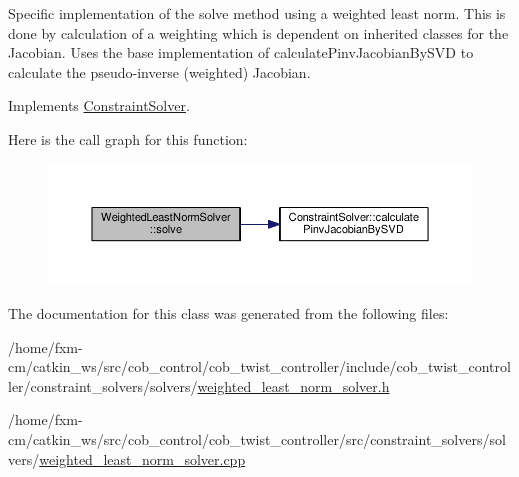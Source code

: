 Specific implementation of the solve method using a weighted least norm. This is done by calculation of a weighting which is dependent on inherited classes for the Jacobian. Uses the base implementation of calculate\-Pinv\-Jacobian\-By\-S\-V\-D to calculate the pseudo-\/inverse (weighted) Jacobian. 

Implements \hyperlink{classConstraintSolver_a6208240cb2dc47fdd9adfc3a069408cd}{Constraint\-Solver}.



Here is the call graph for this function\-:
\nopagebreak
\begin{figure}[H]
\begin{center}
\leavevmode
\includegraphics[width=350pt]{classWeightedLeastNormSolver_a0868fb81e9e75999037d96b4a6407ce7_cgraph}
\end{center}
\end{figure}




The documentation for this class was generated from the following files\-:\begin{DoxyCompactItemize}
\item 
/home/fxm-\/cm/catkin\-\_\-ws/src/cob\-\_\-control/cob\-\_\-twist\-\_\-controller/include/cob\-\_\-twist\-\_\-controller/constraint\-\_\-solvers/solvers/\hyperlink{weighted__least__norm__solver_8h}{weighted\-\_\-least\-\_\-norm\-\_\-solver.\-h}\item 
/home/fxm-\/cm/catkin\-\_\-ws/src/cob\-\_\-control/cob\-\_\-twist\-\_\-controller/src/constraint\-\_\-solvers/solvers/\hyperlink{weighted__least__norm__solver_8cpp}{weighted\-\_\-least\-\_\-norm\-\_\-solver.\-cpp}\end{DoxyCompactItemize}
